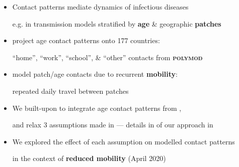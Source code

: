 \begin{itemize}
  \item Contact patterns mediate dynamics of infectious diseases\par
        e.g. in transmission models stratified by \textbf{age} \& geographic \textbf{patches} \cite{Mishra2021}
  \item \citet{Prem2021} project age contact patterns onto 177 countries:\par
        ``home'', ``work'', ``school'', \& ``other'' contacts from \textbf{\textsc{polymod}}
  \item \citet{Arenas2020} model patch/age contacts due to recurrent \textbf{mobility}:\par
        repeated daily travel between patches
  \item We built-upon \cite{Arenas2020} to integrate age contact patterns from \cite{Prem2021},\par
        and relax 3 assumptions made in \cite{Arenas2020} ---
        details in of our approach in \cite{Knight2021}
  \item We explored the effect of each assumption on modelled contact patterns\par
        in the context of \textbf{reduced mobility} (April 2020)
\end{itemize}
